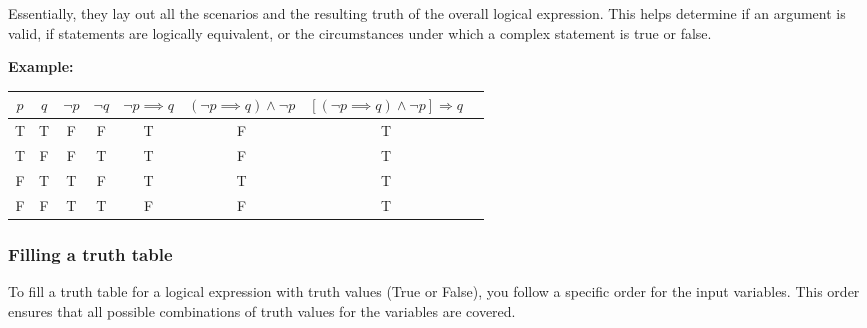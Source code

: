 Essentially, they lay out all the scenarios and the resulting truth of the overall logical expression.
This helps determine if an argument is valid, if statements are logically equivalent, or the circumstances
under which a complex statement is true or false.
\vspace{\baselineskip}

\textbf{Example:}
\vspace{\baselineskip}


\begin{center}
	\begin{tabular}{|c|c|c|c|c|c|c|c|}
		\hline
		\(p\) & \(q\) & \(\neg p\) & \(\neg q\) & \(\neg p \implies q\) & \((\neg p \implies q) \land \neg p\) & \(\left[(\neg p \implies q) \land \neg p\right] \Rightarrow q\) \\
		\hline
		T   & T   & F        & F        & T                      & F                                     & T                                                                \\
		T   & F   & F        & T        & T                      & F                                     & T                                                                \\
		F   & T   & T        & F        & T                      & T                                     & T                                                                \\
		F   & F   & T        & T        & F                      & F                                     & T                                                                \\
		\hline
	\end{tabular}
\end{center}

\subsubsection{Filling a truth table}
To fill a truth table for a logical expression with truth values (True or False), you follow a specific order for the input variables. This order ensures that all possible combinations of truth values for the variables are covered.


